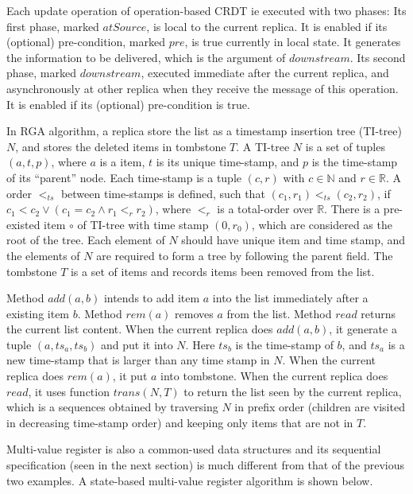 Each update operation of operation-based CRDT ie executed with two phases: Its first phase, marked $\mathit{atSource}$, is local to the current replica. It is enabled if its (optional) pre-condition, marked $\mathit{pre}$, is true currently in local state. It generates the information to be delivered, which is the argument of $\mathit{downstream}$. Its second phase, marked $\mathit{downstream}$, executed immediate after the current replica, and asynchronously at other replica when they receive the message of this operation. It is enabled if its (optional) pre-condition is true.

In RGA algorithm, a replica store the list as a timestamp insertion tree (TI-tree) $N$, and stores the deleted items in tombstone $T$. A TI-tree $N$ is a set of tuples $(a,t,p)$, where $a$ is a item, $t$ is its unique time-stamp, and $p$ is the time-stamp of its ``parent'' node. Each time-stamp is a tuple $(c,r)$ with $c \in \mathbb{N}$ and $r \in \mathbb{R}$. A order $<_{\mathit{ts}}$ between time-stamps is defined, such that $(c_1,r_1) <_{\mathit{ts}} (c_2,r_2)$, if $c_1 < c_2 \vee (c_1 = c_2 \wedge r_1 <_r r_2)$, where $<_r$ is a total-order over $\mathbb{R}$. There is a pre-existed item $\circ$ of TI-tree with time stamp $(0,r_0)$, which are considered as the root of the tree. Each element of $N$ should have unique item and time stamp, and the elements of $N$ are required to form a tree by following the parent field. The tombstone $T$ is a set of items and records items been removed from the list. 

Method $\mathit{add}(a,b)$ intends to add item $a$ into the list immediately after a existing item $b$. Method $\mathit{rem}(a)$ removes $a$ from the list. Method $\mathit{read}$ returns the current list content. When the current replica does $\mathit{add}(a,b)$, it generate a tuple $(a,ts_a,ts_b)$ and put it into $N$. Here $ts_b$ is the time-stamp of $b$, and $ts_a$ is a new time-stamp that is larger than any time stamp in $N$. When the current replica does $\mathit{rem}(a)$, it put $a$ into tombstone. When the current replica does $\mathit{read}$, it uses function $\mathit{trans}(N,T)$ to return the list seen by the current replica, which is a sequences obtained by traversing $N$ in prefix order (children are visited in decreasing time-stamp order) and keeping only items that are not in $T$.


Multi-value register is also a common-used data structures and its sequential specification (seen in the next section) is much different from that of the previous two examples. A state-based multi-value register algorithm is shown below.


